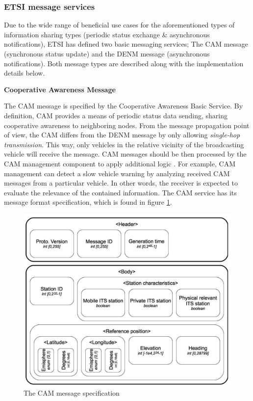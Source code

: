 \documentclass[0main.tex]{subfiles}
\begin{document}
\subsubsection{ETSI message services}

Due to the wide range of beneficial use cases for the aforementioned types of information sharing
types (periodic status exchange \& asynchronous notifications), ETSI has defined two basic
messaging services; The CAM message (synchronous status update) and the DENM message
(asynchronous notifications). Both message types are described along with the implementation 
details below.

\textbf{Cooperative Awareness Message}

The CAM message is specified by the Cooperative Awareness Basic Service. By definition, CAM
provides a means of periodic status data sending, sharing cooperative awareness to neighboring
nodes. From the message propagation point of view, the CAM differs from the DENM message by 
only allowing \emph{single-hop transmission}. This way, only vehicles in the relative vicinity 
of the broadcasting vehicle will receive the message. CAM messages should be then processed by 
the CAM management component to apply additional logic \cite{ETSI2014}. For example, CAM management can 
detect a slow vehicle warning by analyzing received CAM messages from a particular vehicle. 
In other words, the receiver is expected to evaluate the relevance of the contained information.
The CAM service has its message format specification, which is found in figure \ref{cam-spec}. 

\begin{figure}[htbp]
    \centering
    \includegraphics[width=.9\textwidth]{cam-spec.png} 
    \caption{The CAM message specification \cite{Santa2013}}
    \label{cam-spec}
\end{figure}
\end{document}
